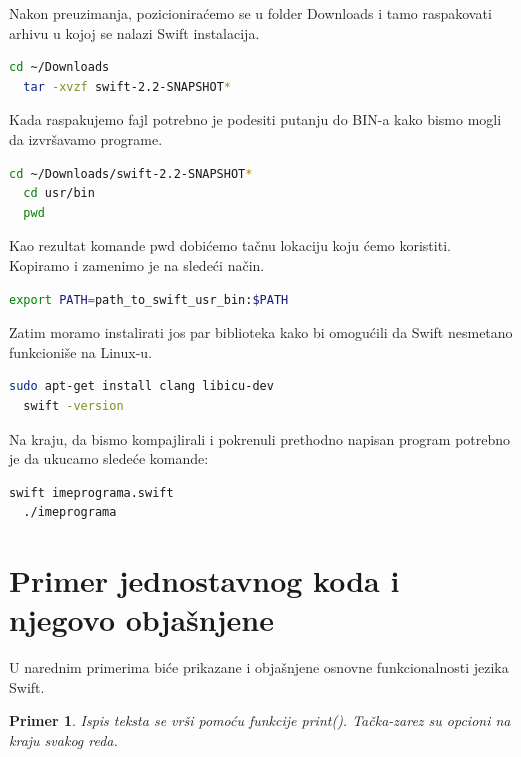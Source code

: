 \documentclass[a4paper]{article}
\newtheorem{primer}{Primer}[section]
\begin{document}
Nakon preuzimanja, pozicioniraćemo se u folder Downloads i tamo raspakovati arhivu u kojoj se nalazi Swift instalacija.

\begin{lstlisting}[language=bash, caption={Raspakovanje Swift instalacije}]
  cd ~/Downloads
  tar -xvzf swift-2.2-SNAPSHOT*
\end{lstlisting}

Kada raspakujemo fajl potrebno je podesiti putanju do BIN-a kako bismo mogli da izvršavamo programe.

\begin{lstlisting}[language=bash, caption={Podešavanje putanje do BIN-a}]
  cd ~/Downloads/swift-2.2-SNAPSHOT*
  cd usr/bin
  pwd
\end{lstlisting}

Kao rezultat komande pwd dobićemo tačnu lokaciju koju ćemo koristiti. Kopiramo i zamenimo je na sledeći način.
\begin{lstlisting}[language=bash, caption={Kopiranje putanje}]
  export PATH=path_to_swift_usr_bin:$PATH
\end{lstlisting}

Zatim moramo instalirati jos par biblioteka kako bi omogućili da Swift nesmetano funkcioniše na Linux-u.

\begin{lstlisting}[language=bash, caption={Instalacija biblioteka}]
  sudo apt-get install clang libicu-dev
  swift -version
\end{lstlisting}

Na kraju, da bismo kompajlirali i pokrenuli prethodno napisan program potrebno je da ukucamo sledeće komande:

\begin{lstlisting}[language=bash, caption={Komanda za kompajliranje}]
  swift imeprograma.swift
  ./imeprograma
\end{lstlisting}

\section{Primer jednostavnog koda i njegovo objašnjene}	
\label{sec:sedmiDeo}
U narednim primerima biće prikazane i objašnjene osnovne funkcionalnosti jezika Swift.

\begin{primer}
Ispis teksta se vrši pomoću funkcije print(). Tačka-zarez su opcioni na kraju svakog reda.
\end{primer}
\end{document}
